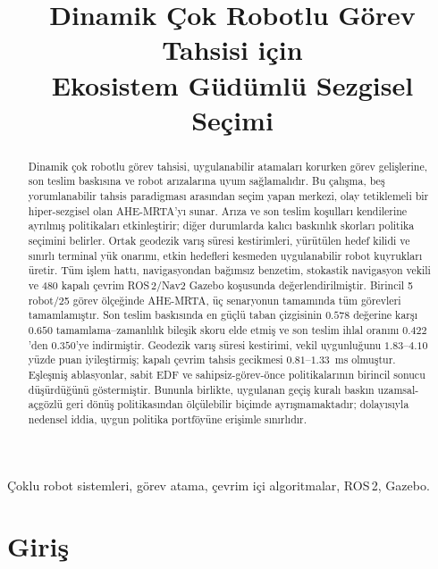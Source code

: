 \documentclass[10pt,letterpaper,onecolumn]{IEEEtran}
\begin{document}
\title{Dinamik Çok Robotlu Görev Tahsisi için\\
  Ekosistem Güdümlü Sezgisel Seçimi}

\author{}

\maketitle

\begin{abstract}
Dinamik çok robotlu görev tahsisi, uygulanabilir atamaları korurken görev
gelişlerine, son teslim baskısına ve robot arızalarına uyum sağlamalıdır. Bu
çalışma, beş yorumlanabilir tahsis paradigması arasından seçim yapan merkezi,
olay tetiklemeli bir hiper-sezgisel olan AHE-MRTA'yı sunar. Arıza ve son teslim
koşulları kendilerine ayrılmış politikaları etkinleştirir; diğer durumlarda
kalıcı baskınlık skorları politika seçimini belirler. Ortak geodezik varış
süresi kestirimleri, yürütülen hedef kilidi ve sınırlı terminal yük onarımı,
etkin hedefleri kesmeden uygulanabilir robot kuyrukları üretir. Tüm işlem
hattı, navigasyondan bağımsız benzetim, stokastik navigasyon vekili ve 480
kapalı çevrim ROS\,2/Nav2 Gazebo koşusunda değerlendirilmiştir. Birincil 5
robot/25 görev ölçeğinde AHE-MRTA, üç senaryonun tamamında tüm görevleri
tamamlamıştır. Son teslim baskısında en güçlü taban çizgisinin $0.578$ değerine
karşı $0.650$ tamamlama--zamanlılık bileşik skoru elde etmiş ve son teslim ihlal
oranını $0.422$'den $0.350$'ye indirmiştir. Geodezik varış süresi kestirimi,
vekil uygunluğunu $1.83$--$4.10$ yüzde puan iyileştirmiş; kapalı çevrim tahsis
gecikmesi $0.81$--$1.33$~ms olmuştur. Eşleşmiş ablasyonlar, sabit EDF ve
sahipsiz-görev-önce politikalarının birincil sonucu düşürdüğünü göstermiştir.
Bununla birlikte, uygulanan geçiş kuralı baskın uzamsal-açgözlü geri dönüş
politikasından ölçülebilir biçimde ayrışmamaktadır; dolayısıyla nedensel iddia,
uygun politika portföyüne erişimle sınırlıdır.
\end{abstract}

\begin{IEEEkeywords}
Çoklu robot sistemleri, görev atama, çevrim içi algoritmalar, ROS\,2, Gazebo.
\end{IEEEkeywords}

\section{Giriş}
\label{sec:intro}
\end{document}
